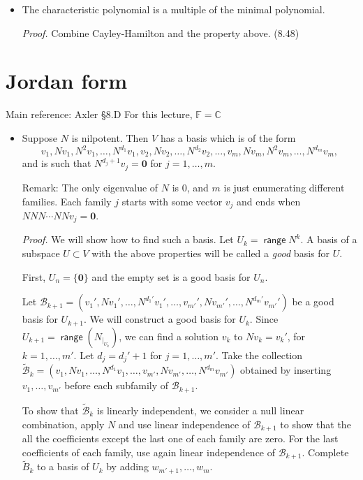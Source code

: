 \documentclass[11pt]{article}
\newcommand{\1}{\mathbf{1}}
\newcommand{\0}{\mathbf{0}}
\newcommand{\B}{\mathcal{B}}
\newcommand{\C}{\mathbb{C}}
\newcommand{\F}{\mathbb{F}}
\DeclareMathOperator{\myrange}{\mathsf{range}}
\begin{document}
{\begin{itemize}
\item

The characteristic polynomial is a multiple of the minimal polynomial.

\emph{Proof.}
Combine Cayley-Hamilton and the property above.
\hfill
(8.48)

\end{itemize}


\clearpage
\section{Jordan form}

Main reference:
Axler \S8.D
\hfill
For this lecture, $\F = \C$

\begin{itemize}

\item

Suppose $N$ is nilpotent.
Then $V$ has a basis which is of the form
$$
v_1,N v_1, N^2 v_1, \dots, N^{d_1} v_1 ,
v_2,N v_2, \dots, N^{d_2} v_2 ,
\dots ,
v_m,N v_m, N^2 v_m, \dots, N^{d_m} v_m,
$$
and is such that $N^{d_j+1}v_j = \0$ for $j=1,\dots,m$.

Remark: The only eigenvalue of $N$ is $0$, and $m$ is just enumerating different families. Each family $j$ starts with some vector $v_j$ and ends when $NNN\cdots NN v_j = \0$.

\emph{Proof.}
We will show how to find such a basis.
Let $U_k = \myrange N^k$.
A basis of a subspace $U \subset V$ with the above properties will be called a \emph{good} basis for $U$.

First, $U_n = \{\0\}$ and the empty set is a good basis for $U_n$.

Let $\B_{k+1} = (
v_1',N v_1', \dots, N^{d_1'} v_1' ,
\dots ,
v_{m'}',N v_{m'}', \dots, N^{d_m'} v_{m'}')
$
be a good basis for $U_{k+1}$.
We will construct a good basis for $U_k$.
Since $U_{k+1} = \myrange (N_{|_{U_k}})$, we can find a solution $v_k$ to $N v_k = v_k'$, for $k=1,\dots,m'$.
Let $d_j = d_j' + 1$ for $j=1,\dots,m'$.
Take the collection
$\tilde{\B}_{k} = (
v_1,N v_1, \dots, N^{d_1} v_1 ,
\dots ,
v_{m'},N v_{m'}, \dots, N^{d_m} v_{m'})
$
obtained by inserting $v_1,\dots,v_{m'}$ before each subfamily of $\B_{k+1}$.

To show that $\tilde{\B}_{k}$ is linearly independent, we consider a null linear combination, apply $N$ and use linear independence of $\B_{k+1}$ to show that the all the coefficients except the last one of each family are zero.
For the last coefficients of each family, use again linear independence of $\B_{k+1}$.
Complete $\tilde{B}_k$ to a basis of $U_k$ by adding $w_{m'+1},\dots,w_m$.


\end{itemize}}
\end{document}
